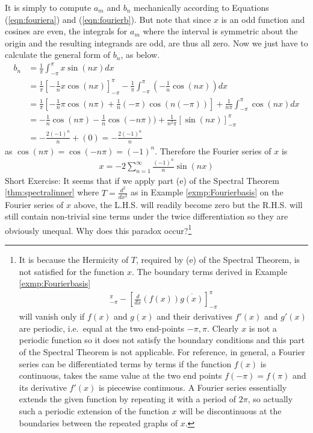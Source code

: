 \begin{solution}
It is simply to compute $a_m$ and $b_n$ mechanically according to Equations (\ref{eqn:fouriera}) and (\ref{eqn:fourierb}). But note that since $x$ is an odd function and cosines are even, the integrals for $a_m$ where the interval is symmetric about the origin and the resulting integrands are odd, are thus all zero. Now we just have to calculate the general form of $b_n$, as below.
\begin{align*}
b_n &= \frac{1}{\pi} \int_{-\pi}^{\pi} x\sin(nx) dx \\
&= \frac{1}{\pi}[-\frac{1}{n}x\cos(nx)]_{-\pi}^{\pi} - \frac{1}{\pi}\int_{-\pi}^{\pi} (-\frac{1}{n}\cos(nx)) dx \\
&= \frac{1}{\pi}[-\frac{1}{n}\pi\cos(n\pi) + \frac{1}{n}(-\pi)\cos(n(-\pi))] + \frac{1}{n\pi}\int_{-\pi}^{\pi} \cos(nx) dx \\
&= -\frac{1}{n}\cos(n\pi) - \frac{1}{n}\cos(-n\pi)) + \frac{1}{n^2\pi}[\sin(nx)]_{-\pi}^{\pi} \\
&= -\frac{2(-1)^n}{n} + (0) = -\frac{2(-1)^n}{n}
\end{align*}
as $\cos(n\pi) = \cos(-n\pi) = (-1)^n$. Therefore the Fourier series of $x$ is
\begin{align*}
x = -2 \sum_{n=1}^{\infty} \frac{(-1)^n}{n} \sin(nx)
\end{align*}
Short Exercise: It seems that if we apply part (e) of the Spectral Theorem \ref{thm:spectralinner} where $T = \frac{d^2}{dx^2}$ as in Example \ref{exmp:Fourierbasis} on the Fourier series of $x$ above, the L.H.S. will readily become zero but the R.H.S. will still contain non-trivial sine terms under the twice differentiation so they are obviously unequal. Why does this paradox occur?\footnote{It is because the Hermicity of $T$, required by (e) of the Spectral Theorem, is not satisfied for the function $x$. The boundary terms derived in Example \ref{exmp:Fourierbasis}
\begin{align*}
[f(x) \frac{d}{dx}\overline{([g(x)])}]_{-\pi}^\pi - [\frac{d}{dx}(f(x)) \overline{g(x)}]_{-\pi}^\pi    
\end{align*}
will vanish only if $f(x)$ and $g(x)$ and their derivatives $f'(x)$ and $g'(x)$ are periodic, i.e.\ equal at the two end-points $-\pi, \pi$. Clearly $x$ is not a periodic function so it does not satisfy the boundary conditions and this part of the Spectral Theorem is not applicable. For reference, in general, a Fourier series can be differentiated terms by terms if the function $f(x)$ is continuous, takes the same value at the two end points $f(-\pi) = f(\pi)$ and its derivative $f'(x)$ is piecewise continuous. A Fourier series essentially extends the given function by repeating it with a period of $2\pi$, so actually such a periodic extension of the function $x$ will be discontinuous at the boundaries between the repeated graphs of $x$.}
\end{solution}

